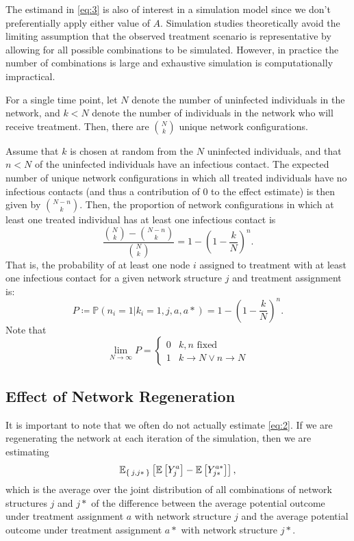 \documentclass{article}
\theoremstyle{definition}
\begin{document}
The estimand in \ref{eq:3} is also of interest in a simulation model since we don't preferentially apply either value of $A$. Simulation studies theoretically avoid the limiting assumption that the observed treatment scenario is representative by allowing for all possible combinations to be simulated. However, in practice the number of combinations is large and exhaustive simulation is computationally impractical.


For a single time point, let $N$ denote the number of uninfected individuals in the network, and $k <N$ denote the number of individuals in the network who will receive treatment. Then, there are $\binom{N}{k}$ unique network configurations.

Assume that $k$ is chosen at random from the $N$ uninfected individuals, and that $n<N$ of the uninfected individuals have an infectious contact. The expected number of unique network configurations  in which all treated individuals have no infectious contacts (and thus a contribution of 0 to the effect estimate) is then given by $\binom{N-n}{k}$. Then, the proportion of network configurations in which at least one treated individual has at least one infectious contact is 
\begin{equation}\label{eq:6}
    \frac{{\binom{N}{k}}-{\binom{N-n}{k}}}{{\binom{N}{k}}}=1-\left(1-\frac{k}{N}\right)^{n}.
\end{equation}
That is, the probability of at least one node $i$ assigned to treatment with at least one infectious contact for a given network structure $j$ and treatment assignment is:
\begin{equation}\label{eq:7}
    P \coloneqq \mathbb{P}\left(n_{i}=1 \vert k_{i}=1,j,a,a*\right)=1-\left(1-\frac{k}{N}\right)^{n}.
\end{equation}
Note that 
\begin{equation}\label{eq:8}
    \lim_{N \to \infty}P=\begin{cases}0 & k,n \text{ fixed} \\ 1 & k \to N \lor n \to N  \end{cases}
\end{equation}

\subsection{Effect of Network Regeneration}
It is important to note that we often do not actually estimate \ref{eq:2}. If we are regenerating the network at each iteration of the simulation, then we are estimating \begin{equation}\label{eq:9}
    \mathbb{E}_{\Set{j,j*}}\left[\mathbb{E}\left[Y_{j}^{a}\right]-\mathbb{E}\left[Y_{j*}^{a*}\right]\right],
\end{equation} 
which is the average over the joint distribution of all combinations of network structures $j$ and $j*$ of the difference between the average potential outcome under treatment assignment $a$ with network structure $j$ and the average potential outcome under  treatment assignment $a*$ with network structure $j*$.
\end{document}

